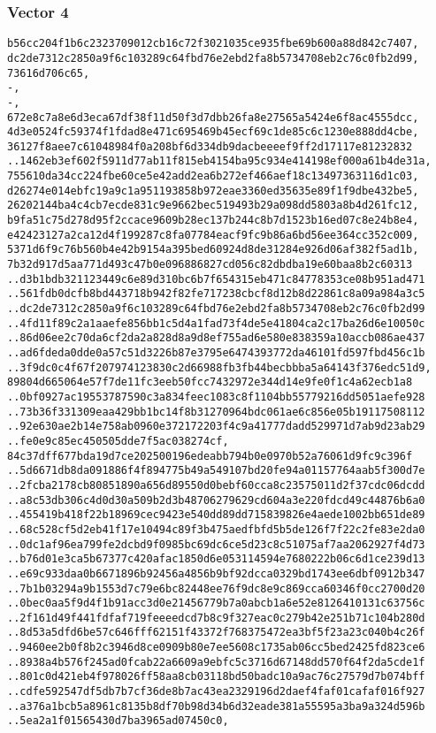 \documentclass[
]{article}
\begin{document}
\subsubsection{Vector 4}\label{vector-4-2}

\begin{verbatim}
b56cc204f1b6c2323709012cb16c72f3021035ce935fbe69b600a88d842c7407,
dc2de7312c2850a9f6c103289c64fbd76e2ebd2fa8b5734708eb2c76c0fb2d99,
73616d706c65,
-,
-,
672e8c7a8e6d3eca67df38f11d50f3d7dbb26fa8e27565a5424e6f8ac4555dcc,
4d3e0524fc59374f1fdad8e471c695469b45ecf69c1de85c6c1230e888dd4cbe,
36127f8aee7c61048984f0a208bf6d334db9dacbeeeef9ff2d17117e81232832
..1462eb3ef602f5911d77ab11f815eb4154ba95c934e414198ef000a61b4de31a,
755610da34cc224fbe60ce5e42add2ea6b272ef466aef18c13497363116d1c03,
d26274e014ebfc19a9c1a951193858b972eae3360ed35635e89f1f9dbe432be5,
26202144ba4c4cb7ecde831c9e9662bec519493b29a098dd5803a8b4d261fc12,
b9fa51c75d278d95f2ccace9609b28ec137b244c8b7d1523b16ed07c8e24b8e4,
e42423127a2ca12d4f199287c8fa07784eacf9fc9b86a6bd56ee364cc352c009,
5371d6f9c76b560b4e42b9154a395bed60924d8de31284e926d06af382f5ad1b,
7b32d917d5aa771d493c47b0e096886827cd056c82dbdba19e60baa8b2c60313
..d3b1bdb321123449c6e89d310bc6b7f654315eb471c84778353ce08b951ad471
..561fdb0dcfb8bd443718b942f82fe717238cbcf8d12b8d22861c8a09a984a3c5
..dc2de7312c2850a9f6c103289c64fbd76e2ebd2fa8b5734708eb2c76c0fb2d99
..4fd11f89c2a1aaefe856bb1c5d4a1fad73f4de5e41804ca2c17ba26d6e10050c
..86d06ee2c70da6cf2da2a828d8a9d8ef755ad6e580e838359a10accb086ae437
..ad6fdeda0dde0a57c51d3226b87e3795e6474393772da46101fd597fbd456c1b
..3f9dc0c4f67f207974123830c2d66988fb3fb44becbbba5a64143f376edc51d9,
89804d665064e57f7de11fc3eeb50fcc7432972e344d14e9fe0f1c4a62ecb1a8
..0bf0927ac19553787590c3a834feec1083c8f1104bb55779216dd5051aefe928
..73b36f331309eaa429bb1bc14f8b31270964bdc061ae6c856e05b19117508112
..92e630ae2b14e758ab0960e372172203f4c9a41777dadd529971d7ab9d23ab29
..fe0e9c85ec450505dde7f5ac038274cf,
84c37dff677bda19d7ce202500196edeabb794b0e0970b52a76061d9fc9c396f
..5d6671db8da091886f4f894775b49a549107bd20fe94a01157764aab5f300d7e
..2fcba2178cb80851890a656d89550d0bebf60cca8c23575011d2f37cdc06dcdd
..a8c53db306c4d0d30a509b2d3b48706279629cd604a3e220fdcd49c44876b6a0
..455419b418f22b18969cec9423e540dd89dd715839826e4aede1002bb651de89
..68c528cf5d2eb41f17e10494c89f3b475aedfbfd5b5de126f7f22c2fe83e2da0
..0dc1af96ea799fe2dcbd9f0985bc69dc6ce5d23c8c51075af7aa2062927f4d73
..b76d01e3ca5b67377c420afac1850d6e053114594e7680222b06c6d1ce239d13
..e69c933daa0b6671896b92456a4856b9bf92dcca0329bd1743ee6dbf0912b347
..7b1b03294a9b1553d7c79e6bc82448ee76f9dc8e9c869cca60346f0cc2700d20
..0bec0aa5f9d4f1b91acc3d0e21456779b7a0abcb1a6e52e8126410131c63756c
..2f161d49f441fdfaf719feeeedcd7b8c9f327eac0c279b42e251b71c104b280d
..8d53a5dfd6be57c646fff62151f43372f768375472ea3bf5f23a23c040b4c26f
..9460ee2b0f8b2c3946d8ce0909b80e7ee5608c1735ab06cc5bed2425fd823ce6
..8938a4b576f245ad0fcab22a6609a9ebfc5c3716d67148dd570f64f2da5cde1f
..801c0d421eb4f978026ff58aa8cb03118bd50badc10a9ac76c27579d7b074bff
..cdfe592547df5db7b7cf36de8b7ac43ea2329196d2daef4faf01cafaf016f927
..a376a1bcb5a8961c8135b8df70b98d34b6d32eade381a55595a3ba9a324d596b
..5ea2a1f01565430d7ba3965ad07450c0,
\end{verbatim}
\end{document}
